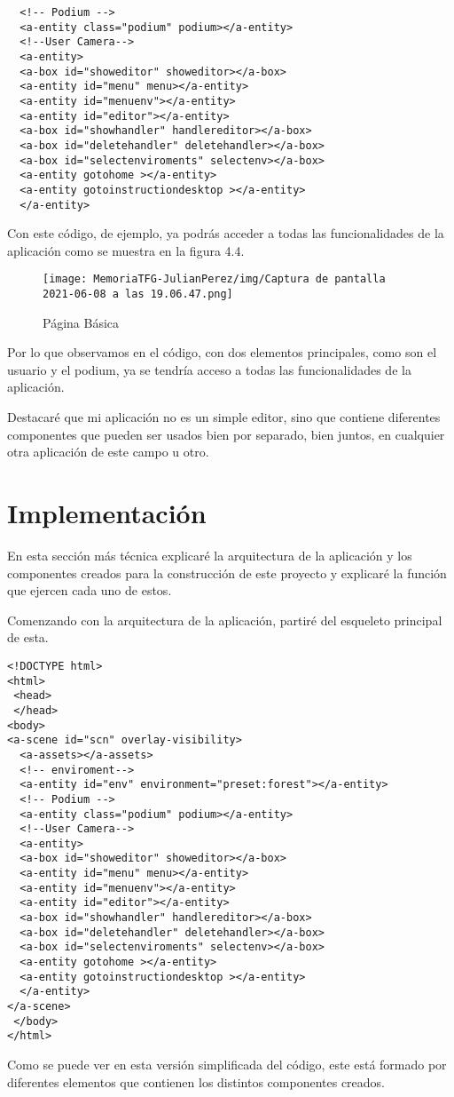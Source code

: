 \documentclass[a4paper, 12pt]{book}
\begin{document}
{\scriptsize
\begin{verbatim}
  <!-- Podium -->
  <a-entity class="podium" podium></a-entity> 
  <!--User Camera-->
  <a-entity>
  <a-box id="showeditor" showeditor></a-box>
  <a-entity id="menu" menu></a-entity>
  <a-entity id="menuenv"></a-entity>
  <a-entity id="editor"></a-entity>
  <a-box id="showhandler" handlereditor></a-box>
  <a-box id="deletehandler" deletehandler></a-box>
  <a-box id="selectenviroments" selectenv></a-box>
  <a-entity gotohome ></a-entity>
  <a-entity gotoinstructiondesktop ></a-entity>
  </a-entity>
\end{verbatim}
}
Con este código, de ejemplo, ya podrás acceder a todas las funcionalidades de la aplicación como se muestra en la figura 4.4.

\begin{figure}[H]
  \centering
  \texttt{[image: MemoriaTFG-JulianPerez/img/Captura de pantalla 2021-06-08 a las 19.06.47.png]}
  \caption{Página Básica }\label{home}
\end{figure}

Por lo que observamos en el código, con dos elementos principales, como son el usuario y el podium, ya se tendría acceso a todas las funcionalidades de la aplicación.

Destacaré que mi aplicación no es un simple editor, sino que contiene diferentes componentes que pueden ser usados bien por separado, bien juntos, en cualquier otra aplicación de este campo u otro.

\section{Implementación} 
\label{sec:Arquitectura resultante}
En esta sección más técnica explicaré la arquitectura de la aplicación y los componentes creados para la construcción de este proyecto y explicaré la función que ejercen cada uno de estos.

Comenzando con la arquitectura de la aplicación, partiré del esqueleto principal de esta.
{\scriptsize
\begin{verbatim}
<!DOCTYPE html>
<html>
 <head>
 </head>
<body>
<a-scene id="scn" overlay-visibility>
  <a-assets></a-assets>
  <!-- enviroment-->
  <a-entity id="env" environment="preset:forest"></a-entity>
  <!-- Podium -->
  <a-entity class="podium" podium></a-entity> 
  <!--User Camera-->
  <a-entity>
  <a-box id="showeditor" showeditor></a-box>
  <a-entity id="menu" menu></a-entity>
  <a-entity id="menuenv"></a-entity>
  <a-entity id="editor"></a-entity>
  <a-box id="showhandler" handlereditor></a-box>
  <a-box id="deletehandler" deletehandler></a-box>
  <a-box id="selectenviroments" selectenv></a-box>
  <a-entity gotohome ></a-entity>
  <a-entity gotoinstructiondesktop ></a-entity>
  </a-entity>
</a-scene>
 </body>
</html> 
\end{verbatim}
}
Como se puede ver en esta versión simplificada del código, este está formado por diferentes elementos que contienen los distintos componentes creados.
\end{document}
